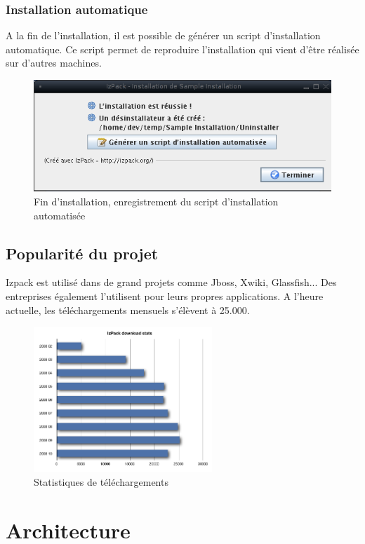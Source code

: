 \subsubsection{Installation automatique}
A la fin de l'installation, il est possible de générer un script d'installation automatique. Ce script permet de reproduire l'installation qui vient d'être réalisée sur d'autres machines.
\begin{figure}[H]
	\centering
	\includegraphics[width=12cm]{../image/SaveInstallXML.png}
	\caption{Fin d'installation, enregistrement du script d'installation automatisée}
\end{figure}
\subsection{Popularité du projet}
Izpack est utilisé dans de grand projets comme Jboss, Xwiki, Glassfish... Des entreprises également l'utilisent pour leurs propres applications. A l'heure actuelle, les téléchargements mensuels s'élèvent à 25.000.
\begin{figure}[H]
	\centering
	\includegraphics[width=0.6\textwidth]{../image/telechargements.png}
	\caption{Statistiques de téléchargements}
\end{figure}
\section{Architecture}

